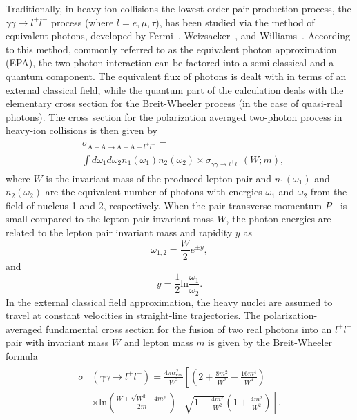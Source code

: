 \documentclass[12pt,epjc3]{svjour3}\sloppy
\begin{document}
\label{sec:flux}
Traditionally, in heavy-ion collisions the lowest order pair production process, the $\gamma\gamma \rightarrow l^+l^-$ process (where $l=e, \mu, \tau$), has been studied via the method of equivalent photons, developed by Fermi~\cite{fermiUberTheorieStosses1924}, Weizsacker~\cite{weizsaeckerAusstrahlungBeiStoessen1934}, and Williams~\cite{williamsNatureHighEnergy1934}. According to this method, commonly referred to as the equivalent photon approximation (EPA), the two photon interaction can be factored into a semi-classical and a quantum component. The equivalent flux of photons is dealt with in terms of an external classical field, while the quantum part of the calculation deals with the elementary cross section for the Breit-Wheeler process (in the case of quasi-real photons). 
The cross section for the polarization averaged two-photon process in heavy-ion collisions is then given by
\begin{align}
    \begin{split}
    & \sigma_{\mathrm{A + A}\rightarrow\mathrm{A + A} + l^+l^-}  = \\ & \int  d\omega_1 d\omega_2  n_1(\omega_1) n_2(\omega_2) \times \sigma_{\gamma\gamma\rightarrow l^+l^-}(W; m), 
    \end{split}
\end{align}
where $W$ is the invariant mass of the produced lepton pair and $n_1(\omega_1)$ and $n_2(\omega_2)$ are the equivalent number of photons with energies $\omega_1$ and $\omega_2$ from the field of nucleus 1 and 2, respectively. When the pair transverse momentum $P_\perp$ is small compared to the lepton pair invariant mass $W$, the photon energies are related to the lepton pair invariant mass and rapidity $y$ as
\begin{equation}
    \omega_{1,2} = \frac{W}{2}e^{\pm y},
\end{equation}
and
\begin{equation}
    y=\frac{1}{2}\text{ln}\frac{\omega_{1}}{\omega_{2}}.
\end{equation}
In the external classical field approximation, the heavy nuclei are assumed to travel at constant velocities in straight-line trajectories. 
The polarization-averaged fundamental cross section for the fusion of two real photons into an $l^+l^-$ pair with invariant mass $W$ and lepton mass $m$ is given by the Breit-Wheeler formula~\cite{breitCollisionTwoLight1934,brodskyTwoPhotonMechanismParticle1971a}
\begin{align}
    \begin{split}
    \label{eq:bw}
        \sigma & (\gamma \gamma \rightarrow l^{+}l^{-}) =  \frac{4\pi \alpha_{em}^{2}}{W^{2}} \left[ \left(2+\frac{8m^{2}}{W^{2}} - \frac{16m^{4}}{W^{4}}\right) \right. \\
        & \times\text{ln}\left(\frac{W+\sqrt{W^{2}-4m^{2}}}{2m}\right) \left. -\sqrt{1-\frac{4m^{2}}{W^{2}}}\left(1+\frac{4m^{2}}{W^{2}}\right)\right].
  \end{split}
\end{align}
\end{document}
